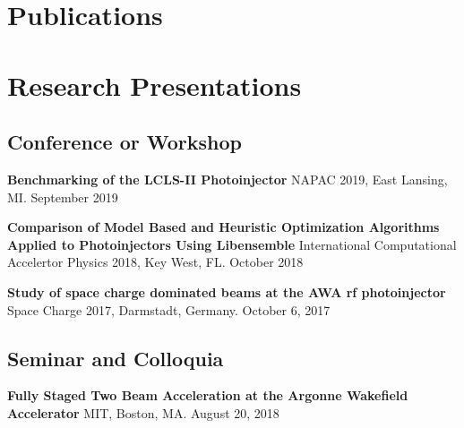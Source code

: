 \documentclass[11pt,a4paper,sans]{moderncv}        %
\begin{document}
\section{Publications}
%





\newpage

\section{Research Presentations}
\subsection{Conference or Workshop} %
\textbf{Benchmarking of the LCLS-II Photoinjector}\newline
NAPAC 2019, East Lansing, MI. September 2019
\vspace{0.3em}

\textbf{Comparison of Model Based and Heuristic Optimization Algorithms \newline
	Applied to Photoinjectors Using Libensemble}\newline
International Computational Accelertor Physics 2018, Key West, FL. October 2018
\vspace{0.3em}

\textbf{Study of space charge dominated beams at the AWA rf photoinjector}\newline
Space Charge 2017, Darmstadt, Germany. October 6, 2017

\subsection{Seminar and Colloquia}
\textbf{Fully Staged Two Beam Acceleration at the Argonne Wakefield Accelerator}\newline
MIT, Boston, MA. August 20, 2018 
\vspace{0.3em}
\end{document}
